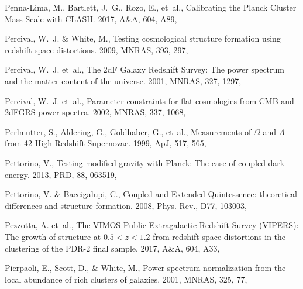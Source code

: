 \documentclass[longauth,traditabstract]{aa}
\def\aap{{A\&A}}
\def\apj{{ApJ}}
\def\mnras{{MNRAS}}
\def\prd{{PRD}}
\begin{document}
\begin{thebibliography}{379}
Penna-Lima, M., Bartlett, J.~G., Rozo, E., {et~al.}, {Calibrating the Planck
  Cluster Mass Scale with CLASH}. 2017, \aap, 604, A89, 

{Percival}, W.~J. \& {White}, M., {Testing cosmological structure formation
  using redshift-space distortions}. 2009, \mnras, 393, 297, 

Percival, W.~J. {et~al.}, The 2dF Galaxy Redshift Survey: The power spectrum
  and the matter content of the universe. 2001, \mnras, 327, 1297,

Percival, W.~J. {et~al.}, {Parameter constraints for flat cosmologies from CMB
  and 2dFGRS power spectra}. 2002, \mnras, 337, 1068, 

{Perlmutter}, S., {Aldering}, G., {Goldhaber}, G., {et~al.}, {Measurements of
  {$\Omega$} and {$\Lambda$} from 42 High-Redshift Supernovae}. 1999, \apj,
  517, 565, 

{Pettorino}, V., {Testing modified gravity with Planck: The case of coupled
  dark energy}. 2013, \prd, 88, 063519, 

Pettorino, V. \& Baccigalupi, C., {Coupled and Extended Quintessence:
  theoretical differences and structure formation}. 2008, Phys. Rev., D77,
  103003, 

Pezzotta, A. {et~al.}, {The VIMOS Public Extragalactic Redshift Survey
  (VIPERS): The growth of structure at $0.5 < z < 1.2$ from redshift-space
  distortions in the clustering of the PDR-2 final sample}. 2017, \aap, 604,
  A33, 

{Pierpaoli}, E., {Scott}, D., \& {White}, M., {Power-spectrum normalization
  from the local abundance of rich clusters of galaxies}. 2001, \mnras, 325,
  77, 


\end{thebibliography}
\end{document}
